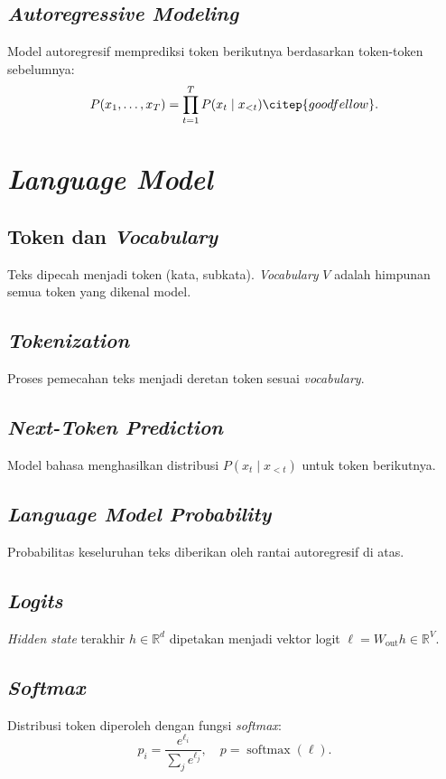 \subsection{\textit{Autoregressive Modeling}}
Model autoregresif memprediksi token berikutnya berdasarkan token-token sebelumnya:
\begin{equation}
P(x_1, \dots, x_T) = \prod_{t=1}^T P(x_t \mid x_{<t}) \citep{goodfellow}.
\end{equation}

\section{\textit{Language Model}}

\subsection{Token dan \textit{Vocabulary}}
Teks dipecah menjadi token (kata, subkata). \textit{Vocabulary} \(V\) adalah himpunan semua token yang dikenal model.

\subsection{\textit{Tokenization}}
Proses pemecahan teks menjadi deretan token sesuai \textit{vocabulary}.

\subsection{\textit{Next-Token Prediction}}
Model bahasa menghasilkan distribusi \(P(x_t \mid x_{<t})\) untuk token berikutnya.

\subsection{\textit{Language Model Probability}}
Probabilitas keseluruhan teks diberikan oleh rantai autoregresif di atas.

\subsection{\textit{Logits}}
\textit{Hidden state} terakhir \(h \in \mathbb{R}^d\) dipetakan menjadi vektor logit \(\ell = W_{\mathrm{out}} h \in \mathbb{R}^V\).

\subsection{\textit{Softmax}}
Distribusi token diperoleh dengan fungsi \textit{softmax}:
\begin{equation}
p_i = \frac{e^{\ell_i}}{\sum_j e^{\ell_j}}, \quad p = \operatorname{softmax}(\ell).
\end{equation}


